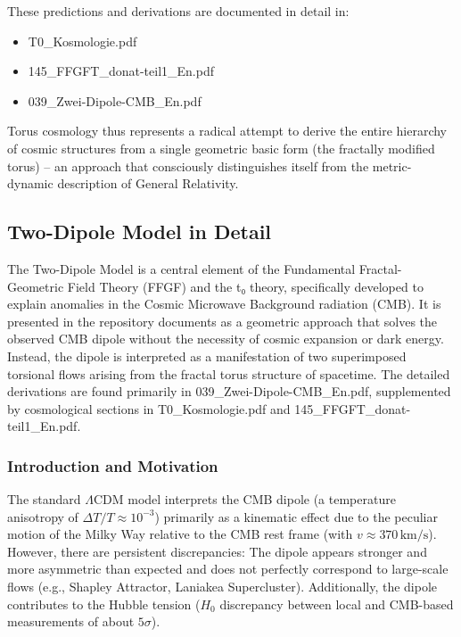 \documentclass[12pt,a4paper]{article}
\begin{document}
These predictions and derivations are documented in detail in:
\begin{itemize}
	\item T0\_Kosmologie.pdf
	\item 145\_FFGFT\_donat-teil1\_En.pdf
	\item 039\_Zwei-Dipole-CMB\_En.pdf
\end{itemize}

Torus cosmology thus represents a radical attempt to derive the entire hierarchy of cosmic structures from a single geometric basic form (the fractally modified torus) – an approach that consciously distinguishes itself from the metric-dynamic description of General Relativity.

\subsection{Two-Dipole Model in Detail}

The Two-Dipole Model is a central element of the Fundamental Fractal-Geometric Field Theory (FFGF) and the t₀ theory, specifically developed to explain anomalies in the Cosmic Microwave Background radiation (CMB). It is presented in the repository documents as a geometric approach that solves the observed CMB dipole without the necessity of cosmic expansion or dark energy. Instead, the dipole is interpreted as a manifestation of two superimposed torsional flows arising from the fractal torus structure of spacetime. The detailed derivations are found primarily in 039\_Zwei-Dipole-CMB\_En.pdf, supplemented by cosmological sections in T0\_Kosmologie.pdf and 145\_FFGFT\_donat-teil1\_En.pdf.

\subsubsection{Introduction and Motivation}

The standard $\Lambda$CDM model interprets the CMB dipole (a temperature anisotropy of $\Delta T / T \approx 10^{-3}$) primarily as a kinematic effect due to the peculiar motion of the Milky Way relative to the CMB rest frame (with $v \approx 370\,\text{km/s}$). However, there are persistent discrepancies: The dipole appears stronger and more asymmetric than expected and does not perfectly correspond to large-scale flows (e.g., Shapley Attractor, Laniakea Supercluster). Additionally, the dipole contributes to the Hubble tension ($H_0$ discrepancy between local and CMB-based measurements of about $5\sigma$).
\end{document}
